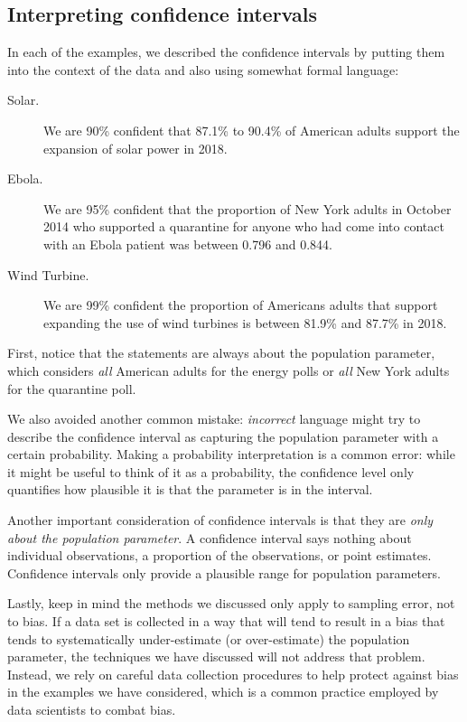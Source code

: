 \subsection{Interpreting confidence intervals}
\label{interpretingCIs}


In each of the examples, we described the confidence
intervals by putting them into the context of the data and also
using somewhat formal language:
\begin{description}
  \item[Solar.] We are 90\% confident that 87.1\% to 90.4\% of
      American adults support the expansion of solar power in 2018.
  \item[Ebola.] We are 95\% confident that the proportion
      of New York adults in October 2014 who supported a quarantine
      for anyone who had come into contact with an Ebola patient was
      between 0.796 and 0.844.
  \item[Wind Turbine.] We are 99\% confident the proportion of
      Americans adults that support expanding the use of wind
      turbines is between 81.9\% and 87.7\% in 2018.
\end{description}
First, notice that the statements are always about the population
parameter, which considers \emph{all} American adults for the
energy polls or \emph{all} New York adults for the quarantine poll.

We also avoided another common mistake:
\emph{incorrect} language might try to describe the confidence interval
as capturing the population parameter with a certain probability.
Making a probability interpretation is a common error:
while it might be useful to think of it as a probability,
the confidence level only quantifies how plausible
it is that the parameter is in the interval.

Another important consideration of confidence intervals is that they
are \emph{only about the population parameter}.
A confidence interval says nothing about individual
observations, a proportion of the observations,
or point estimates.
Confidence intervals only provide a plausible range for
population parameters.

Lastly, keep in mind the methods we discussed only apply
to sampling error, not to bias.
If a data set is collected in a way that will tend to result
in a bias that tends to systematically under-estimate
(or over-estimate) the population parameter, the techniques
we have discussed will not address that problem.
Instead, we rely on careful data collection procedures to
help protect against bias in the examples we have considered,
which is a common practice employed by data scientists
to combat bias.


